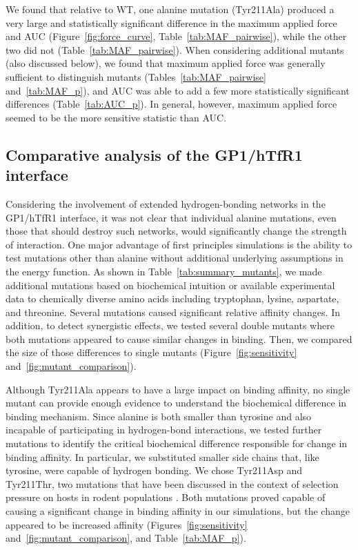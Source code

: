 \documentclass[12pt]{article} %
\providecommand{\DIFaddbegin}{} %
\providecommand{\DIFaddend}{} %
\providecommand{\DIFdelbegin}{} %
\providecommand{\DIFdelend}{} %
\begin{document}
We found that relative to WT, one alanine mutation (Tyr211Ala) produced a very large and statistically significant difference in the maximum applied force and AUC (Figure~\ref{fig:force_curve}, Table~\ref{tab:MAF_pairwise}), while the other two did not (Table~\ref{tab:MAF_pairwise}). When considering additional mutants (also discussed below), we found that maximum applied force was generally sufficient to distinguish mutants (Tables~\ref{tab:MAF_pairwise} and~\ref{tab:MAF_p}), and AUC was able to add a few more statistically significant differences (Table~\ref{tab:AUC_p}). In general, however, maximum applied force seemed to be the more sensitive statistic than AUC.

\subsection{Comparative analysis of the GP1/hTfR1 interface}
Considering the involvement of extended hydrogen-bonding networks in the GP1/hTfR1 interface, it was not clear that individual alanine mutations, even those that should destroy such networks, would significantly change the strength of interaction. One major advantage of first principles simulations is the ability to test mutations other than alanine without additional underlying assumptions in the energy function. As shown in Table~\ref{tab:summary_mutants}, we made additional mutations based on biochemical intuition or available experimental data to chemically diverse amino acids including tryptophan, lysine, aspartate, and threonine. Several mutations caused significant relative affinity changes. In addition, to detect synergistic effects, we tested several double mutants where both mutations appeared to cause similar changes in binding. Then, we compared the size of those differences to single mutants (Figure~\ref{fig:sensitivity} and~\ref{fig:mutant_comparison}).

Although Tyr211Ala appears to have a large impact on binding affinity, no single mutant can provide enough evidence to understand the biochemical difference in binding mechanism. Since alanine is both smaller than tyrosine and also incapable of participating in hydrogen-bond interactions, we tested further mutations to identify the critical biochemical difference responsible for change in binding affinity. In particular, we substituted smaller side chains that, like tyrosine, were capable of hydrogen bonding. We chose Tyr211Asp and Tyr211Thr, two mutations that have been discussed in the context of selection pressure on hosts in rodent populations \DIFdelbegin %
\DIFdelend \DIFaddbegin \citep{Rad2008,Rad20111,Rad20112}\DIFaddend . Both mutations proved capable of causing a significant change in binding affinity in our simulations, but the change appeared to be increased affinity (Figures~\ref{fig:sensitivity} and~\ref{fig:mutant_comparison}, and Table~\ref{tab:MAF_p}).
\end{document}
